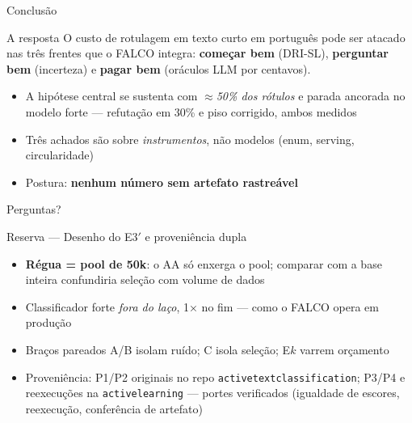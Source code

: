 \documentclass[aspectratio=169,11pt]{beamer}
\begin{document}
\begin{frame}{Conclusão}
\begin{block}{A resposta}
O custo de rotulagem em texto curto em português pode ser atacado nas três
frentes que o FALCO integra: \textbf{começar bem} (DRI-SL), \textbf{perguntar
bem} (incerteza) e \textbf{pagar bem} (oráculos LLM por centavos).
\end{block}
\begin{itemize}\footnotesize
  \item A hipótese central se sustenta com \emph{$\approx$50\% dos rótulos} e
        parada ancorada no modelo forte --- refutação em 30\% e piso corrigido, ambos medidos
  \item Três achados são sobre \emph{instrumentos}, não modelos (enum, serving, circularidade)
  \item Postura: \textbf{nenhum número sem artefato rastreável}
\end{itemize}
\vspace{0.6em}
\quad Perguntas?
\end{frame}


\appendix
\begin{frame}{Reserva --- Desenho do E3$'$ e proveniência dupla}
\footnotesize
\begin{itemize}
  \item \textbf{Régua = pool de 50k}: o AA só enxerga o pool; comparar com a
        base inteira confundiria seleção com volume de dados
  \item Classificador forte \emph{fora do laço}, 1× no fim --- como o FALCO opera em produção
  \item Braços pareados A/B isolam ruído; C isola seleção; E$k$ varrem orçamento
  \item Proveniência: P1/P2 originais no repo \texttt{activetextclassification};
        P3/P4 e reexecuções na \texttt{activelearning} --- portes verificados
        (igualdade de escores, reexecução, conferência de artefato)
\end{itemize}
\end{frame}
\end{document}
